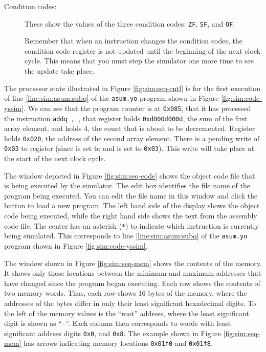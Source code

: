 \documentclass[11pt]{article}
\begin{document}
\begin{description}
\item[Condition codes:]
These show the values of the three condition codes: 
\texttt{ZF}, \texttt{SF}, and \texttt{OF}\@.

Remember that when an instruction changes the condition codes, the
condition code register is not updated until the beginning of the next clock
cycle.  This means that you must step the simulator one more time to
see the update take place.

\end{description}

The processor state illustrated in Figure \ref{fig:sim:seq-cntl} is
for the first execution of line \ref{line:sim:asum:subq} of the \texttt{asum.yo} program
shown in Figure \ref{fig:sim:code-yssim}.  We can see that the program
counter is at \texttt{0x085}, that it has processed the instruction
\texttt{addq \rviiireg{}, \rdireg{}}, that register \raxreg{} holds
\texttt{0xd000d000d}, the sum of the first array element, and \rsireg{}
holds 4, the count that is about to be decremented.  Register
\rdireg{} holds \texttt{0x020}, the address of the second array
element.  There
is a pending write of \texttt{0x03} to register \rsireg{}
(since  is set to \rsireg{} and  is set
to \texttt{0x03}).  This write will take place at the start of the
next clock cycle.

The window depicted in Figure \ref{fig:sim:seq-code} shows the object
code file that is being executed by the simulator.
The edit box
identifies the file name of the program being executed.  You can edit
the file name in this window and click the  button to load
a new program.  The left hand side of the display shows the object
code being executed, while the right hand side shows the text from the
assembly code file.  The center has an asterisk (\texttt{*}) to
indicate which instruction is currently being simulated.  This
corresponds to line \ref{line:sim:asum:subq} of the \texttt{asum.yo} program shown in Figure
\ref{fig:sim:code-yssim}.

The window shown in Figure \ref{fig:sim:seq-mem} shows the contents of
the memory.  It shows only those locations between the minimum and
maximum addresses that have changed since the program began executing.
Each row shows the contents of two memory words.  Thus, each row
shows 16 bytes of the memory, where the addresses of the bytes differ
in only their least significant hexadecimal digits.  To the left of
the memory values is the ``root'' address, where the least significant
digit is shown as ``\texttt{-}''.  Each column then corresponds to
words with least significant address digits \texttt{0x0},
and \texttt{0x8}.  The example shown in
Figure \ref{fig:sim:seq-mem} has arrows indicating memory locations
\texttt{0x01f0} and \texttt{0x01f8}.
\end{document}
